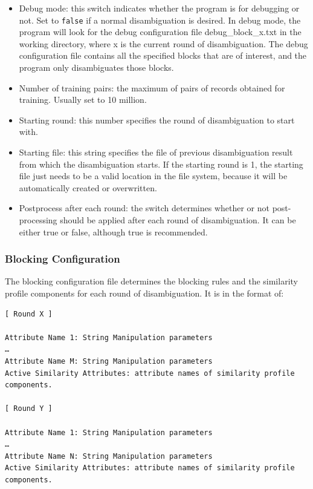 \documentclass{article}
\begin{document}
\begin{itemize}
\item Debug mode: this switch indicates whether the program is
for debugging or not. Set to \texttt{false} if a normal
disambiguation is desired. In debug mode, the program will
look for the debug configuration file debug\_block\_x.txt
in the working directory, where x is the current round
of disambiguation. The debug configuration file contains all
the specified blocks that are of interest, and the program only
disambiguates those blocks.

\item Number of training pairs: the maximum of pairs of records
obtained for training. Usually set to 10 million.

\item Starting round: this number specifies the round of
disambiguation to start with.

\item Starting file: this string specifies the file of previous
disambiguation result from which the disambiguation starts. If the
starting round is 1, the starting file just needs to be a valid
location in the file system, because it will be automatically
created or overwritten.


\item Postprocess after each round: the switch determines whether
or not post-processing should be applied after each round of
disambiguation. It can be either true or false,
although true is recommended.

\end{itemize}

\subsubsection{Blocking Configuration}


The blocking configuration file determines the blocking 
rules and the similarity profile components
for each round of disambiguation. It is in the format of:

\begin{verbatim}
[ Round X ]

Attribute Name 1: String Manipulation parameters
…
Attribute Name M: String Manipulation parameters
Active Similarity Attributes: attribute names of similarity profile components.

[ Round Y ]

Attribute Name 1: String Manipulation parameters
…
Attribute Name N: String Manipulation parameters
Active Similarity Attributes: attribute names of similarity profile components.
\end{verbatim}
\end{document}
